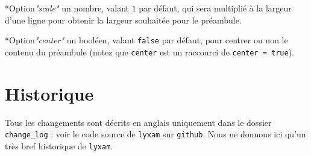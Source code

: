 \documentclass[12pt,a4paper]{scrartcl}
\makeatletter
\theoremstyle{definition}
\newcommand\IDenv{\@ifstar{\@IDenvStar}{\@IDenvNoStar}}
\newcommand\@IDenvNoStar[3]{%
    \texttt{%
    	\textbackslash#1%
    	\IfStrEq{#2}{0}{}{%
    		\,\,[#2 Option%
			\IfStrEq{#2}{1}{}{s}]%
		}%
	    \IfStrEq{#3}{}{}{%
    		\,\,(#3 Argument%
			\IfStrEq{#3}{1}{}{s})%
		}
   	}
    \immediate\write\tempfile{env@#1@#2@#3}%
}
\newcommand\@IDenvStar[2]{%
    \@IDenvNoStar{#1}{0}{#2}%
}
\newcommand\@IDoptarg{\@ifstar{\@IDoptargStar}{\@IDoptargNoStar}}
\newcommand\@IDoptargStar[2]{%
	\vspace{0.5em}
	--- \texttt{#1%
		\IfStrEq{#2}{}{:}{\,#2:}%
	}%
}
\newcommand\@IDoptargNoStar[2]{%
	\IfStrEq{#2}{}{%
		\@IDoptargStar{#1}{}%
	}{%
		\@IDoptargStar{#1}{\##2}%
	}%
}
\newcommand\IDkey[1]{%
	\@IDoptarg*{Option}{{\itshape "#1"}}%
}
\makeatother
\begin{document}
\IDenv{preamble}{2}{}

\IDkey{scale} un nombre, valant $1$ par défaut, qui sera multiplié à la largeur d'une ligne pour obtenir la largeur souhaitée pour le préambule.

\IDkey{center} un booléen, valant \verb+false+ par défaut, pour centrer ou non le contenu du préambule (notez que \verb+center+ est un raccourci de \verb+center = true+).





\section{Historique}

Tous les changements sont décrits en anglais uniquement dans le dossier \verb+change_log+ : voir le code source de \verb+lyxam+ sur \verb+github+. Nous ne donnons ici qu'un très bref historique de \verb+lyxam+.
\end{document}
